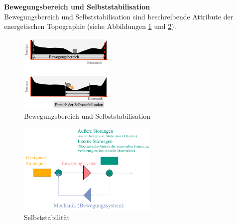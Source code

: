 \textbf{Bewegungsbereich und Selbststabilisation}\\
Bewegungsbereich und Selbststabilisation sind beschreibende Attribute der energetischen Topographie (siehe Abbildungen \ref{bew_stab} und \ref{stab}).
\begin{figure}[h!]
	\centering
	\includegraphics[width=0.4\textwidth]{figures/ch06_bew_stab.png}
	\caption{Bewegungsbereich und Selbststabilisation}
	\label{bew_stab}
\end{figure}
\begin{figure}[h!]
	\centering
	\includegraphics[width=0.6\textwidth]{figures/ch06_selbststab.png}
	\caption{Selbststabilität}
	\label{stab}
\end{figure}

